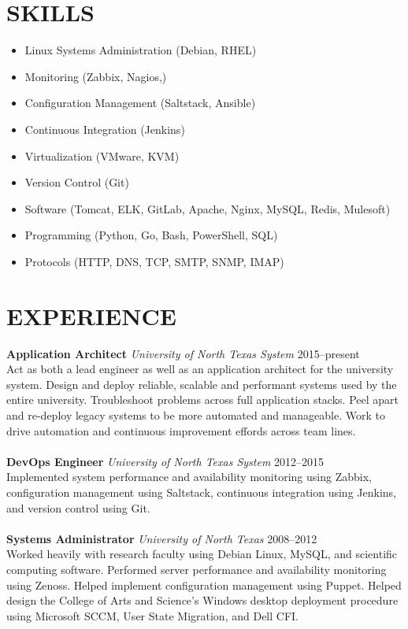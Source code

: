 \documentclass[line, margin,]{res}
\begin{document}
\address{315 S Locust St Apt 301 $\cdot$ Denton, TX 76201 $\cdot$ (940) 783-2400 $\cdot$ mtsanderson@gmail.com $\cdot$ github: mtsanderson}
 
\begin{resume}
\section{SKILLS}
\begin{itemize}[leftmargin=10pt]
    \item Linux Systems Administration (Debian, RHEL)
    \item Monitoring (Zabbix, Nagios,)
    \item Configuration Management (Saltstack, Ansible)
    \item Continuous Integration (Jenkins)
    \item Virtualization (VMware, KVM)
    \item Version Control (Git)
    \item Software (Tomcat, ELK, GitLab, Apache, Nginx, MySQL, Redis, Mulesoft)
    \item Programming (Python, Go, Bash, PowerShell, SQL)
    \item Protocols (HTTP, DNS, TCP, SMTP, SNMP, IMAP)
\end{itemize}
 
\section{EXPERIENCE} 
\textbf{Application Architect}
\textit{University of North Texas System} \hfill 2015--present \\ [5pt]
Act as both a lead engineer as well as an application architect for the university system. Design and deploy reliable, scalable and performant systems used by the entire university. Troubleshoot problems across full application stacks. Peel apart and re-deploy legacy systems to be more automated and manageable. Work to drive automation and continuous improvement effords across team lines. \\ \\
\textbf{DevOps Engineer}
\textit{University of North Texas System} \hfill 2012--2015 \\ [5pt]
Implemented system performance and availability monitoring using Zabbix, configuration management using Saltstack, continuous integration using Jenkins, and version control using Git. \\ \\
\textbf{Systems Administrator}
\textit{University of North Texas} \hfill 2008--2012 \\ [5pt]
Worked heavily with research faculty using Debian Linux, MySQL, and scientific computing software. Performed server performance and availability monitoring using Zenoss. Helped implement configuration management using Puppet. Helped design the College of Arts and Science's Windows desktop deployment procedure using Microsoft SCCM, User State Migration, and Dell CFI.


\end{resume}
\end{document}
